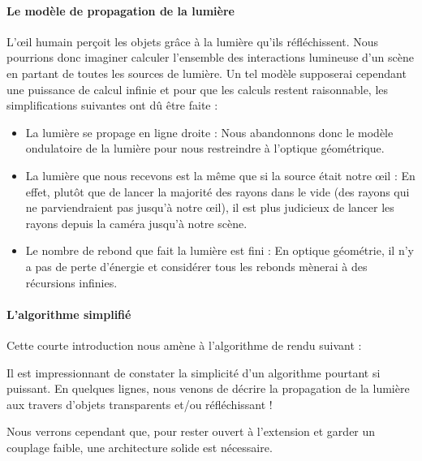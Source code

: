 \paragraph{Le modèle de propagation de la lumière}
L'œil humain perçoit les objets grâce à la lumière qu'ils réfléchissent. Nous
pourrions donc imaginer calculer l'ensemble des interactions lumineuse d'un
scène en partant de toutes les sources de lumière. Un tel modèle supposerai
cependant une puissance de calcul infinie et pour que les calculs restent
raisonnable, les simplifications suivantes ont dû être faite :
\begin{itemize}
  \item La lumière se propage en ligne droite : Nous abandonnons donc le
    modèle ondulatoire de la lumière pour nous restreindre à l'optique
    géométrique.
  \item La lumière que nous recevons est la même que si la source était notre
    œil : En effet, plutôt que de lancer la majorité des rayons dans le vide
    (\ie des rayons qui ne parviendraient pas jusqu'à notre œil), il est plus
    judicieux de lancer les rayons depuis la caméra jusqu'à notre scène.
  \item Le nombre de rebond que fait la lumière est fini : En optique
    géométrie, il n'y a pas de perte d'énergie et considérer tous les rebonds
    mènerai à des récursions infinies.
\end{itemize}

\paragraph{L'algorithme simplifié}
Cette courte introduction nous amène à l'algorithme de rendu suivant :



Il est impressionnant de constater la simplicité d'un algorithme pourtant si
puissant. En quelques lignes, nous venons de décrire la propagation de la
lumière aux travers d'objets transparents et/ou réfléchissant !

Nous verrons cependant que, pour rester ouvert à l'extension et garder un
couplage faible, une architecture solide est nécessaire.



